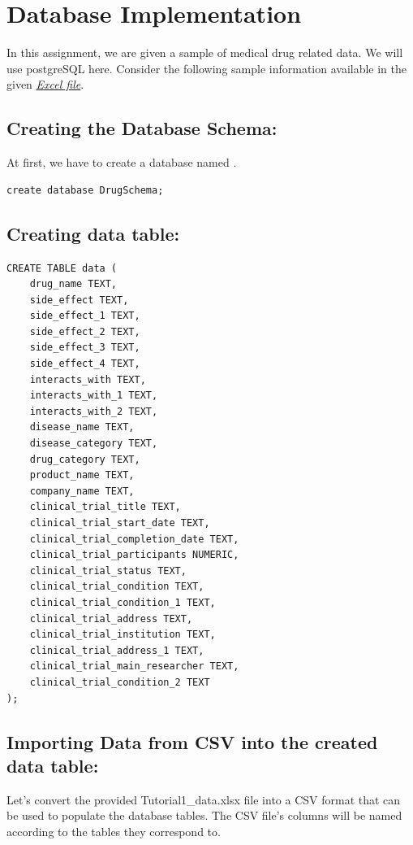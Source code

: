 \documentclass[12pt,a4paper]{article}
\begin{document}
\section{Database Implementation}



In this assignment, we are given a sample of medical drug related data. We will use postgreSQL here. Consider the following sample information available  in the given \href{https://docs.google.com/spreadsheets/d/1DBcLdSKGq2FFMarl1Mj08LblRGRgo8IVbphSGerWoiY/edit?gid=1736641593#gid=1736641593}{\textit{Excel file}}.
\subsection{Creating the Database Schema:}
At first, we have to create a database named .

\begin{lstlisting}[style=sqlstyle]
create database DrugSchema;
\end{lstlisting}
\subsection{Creating data table:}
\begin{lstlisting}[style=sqlstyle]
CREATE TABLE data (
    drug_name TEXT,
    side_effect TEXT,
    side_effect_1 TEXT,
    side_effect_2 TEXT,
    side_effect_3 TEXT,
    side_effect_4 TEXT,
    interacts_with TEXT,
    interacts_with_1 TEXT,
    interacts_with_2 TEXT,
    disease_name TEXT,
    disease_category TEXT,
    drug_category TEXT,
    product_name TEXT,
    company_name TEXT,
    clinical_trial_title TEXT,
    clinical_trial_start_date TEXT,
    clinical_trial_completion_date TEXT,
    clinical_trial_participants NUMERIC,
    clinical_trial_status TEXT,
    clinical_trial_condition TEXT,
    clinical_trial_condition_1 TEXT,
    clinical_trial_address TEXT,
    clinical_trial_institution TEXT,
    clinical_trial_address_1 TEXT,
    clinical_trial_main_researcher TEXT,
    clinical_trial_condition_2 TEXT
);
\end{lstlisting}
\subsection{Importing Data from CSV into the created data table:}

Let's convert the provided Tutorial1\_data.xlsx file into a CSV format that can be used to populate the database tables. The CSV file's columns will be named according to the tables they correspond to.
\end{document}

